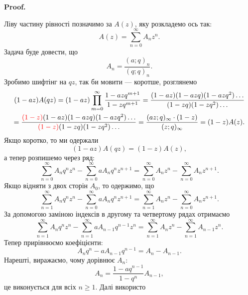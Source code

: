 \documentclass[a4paper, 14pt]{extarticle}
\makeatletter
\theoremstyle{theoremdd}
\theoremstyle{theoremdd}
\theoremstyle{theoremdd}
\theoremstyle{theoremdd}
\theoremstyle{theoremdd}
\theoremstyle{theoremdd}
\theoremstyle{theoremdd}
\theoremstyle{theoremdd}
\theoremstyle{theoremdd}
\theoremstyle{theoremdd}
\theoremstyle{theoremdd}
\theoremstyle{theoremdd}
\theoremstyle{theoremdd}
\theoremstyle{theoremdd}
\theoremstyle{theoremdd}
\renewenvironment{proof}[1][Proof.\\]{\par
\pushQED{\hfill \qed}%
\normalfont \topsep6\p@\@plus6\p@\relax
\trivlist
\item\relax
{\bfseries
#1\@addpunct{.}}\hspace\labelsep\ignorespaces
}{%
\popQED\endtrivlist\@endpefalse
}
\makeatother
\begin{document}
\begin{proof}
Ліву частину рівності позначимо за $A(z)$, яку розкладемо ось так:
\[
A(z) = \sum_{n=0}^\infty A_n z^n.
\]
Задача буде довести, що
\[
A_n = \dfrac{(a;q)_n}{(q;q)_n}.
\]
Зробимо шифтінг на $qz$, так би мовити --- коротше, розглянемо
\begin{align*}
(1-az) A(qz) = (1-az) \prod_{m=0}^\infty \dfrac{1-azq^{m+1}}{1-zq^{m+1}} = \dfrac{(1-az)(1-azq)(1-azq^2) \dots}{(1-zq)(1-zq^2) \dots} \\
= \dfrac{\textcolor{red}{(1-z)} (1-az)(1-azq)(1-azq^2) \dots}{\textcolor{red}{(1-z)}(1-zq)(1-zq^2) \dots} = \dfrac{(az;q)_\infty \cdot (1-z)}{(z;q)_\infty} = (1-z) A(z).
\end{align*}
Якщо коротко, то ми одержали
\[
(1-az) A(qz) = (1-z)A(z),
\]
а тепер розпишемо через ряд:
\[
\sum_{n=0}^\infty A_n q^n z^n - \sum_{n=0}^\infty a A_n q^n z^{n+1} = \sum_{n=0}^\infty A_n z^n - \sum_{n=0}^\infty A_n z^{n+1}.
\]
Якщо відняти з двох сторін $A_0$, то одержимо, що
\[
\sum_{n=1}^\infty A_n q^n z^n - \sum_{n=0}^\infty a A_n q^n z^{n+1} = \sum_{n=1}^\infty A_n z^n - \sum_{n=0}^\infty A_n z^{n+1}.
\]
За допомогою заміною індексів в другому та четвертому рядах отримаємо
\[
\sum_{n=1}^\infty A_n q^n z^n - \sum_{n=1}^\infty a A_{n-1} q^{n-1} z^{n} = \sum_{n=1}^\infty A_n z^n - \sum_{n=1}^\infty A_{n-1} z^{n}.
\]
Тепер прирівнюємо коефіцієнти:
\[
A_n q^n - a A_{n-1} q^{n-1} = A_n - A_{n-1}.
\]
Нарешті, виражаємо, чому дорівнює $A_n$:
\[
A_n = \dfrac{1-aq^{n-1}}{1-q^n} A_{n-1},
\]
це виконується для всіх $n \geq 1$. Далі використо
\end{proof}
\end{document}
